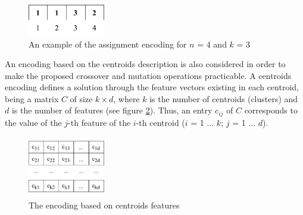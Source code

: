 \begin{figure}[h]
  \begin{center}
    \includegraphics[width=0.3\textwidth]{img/assignment-encoding}
    \caption{An example of the assignment encoding for $n$ = 4 and $k$ = 3}\label{fig:assignment-encoding}
  \end{center}
\end{figure}

An encoding based on the centroids description is also considered in order to make the proposed crossover and mutation operations practicable. A centroids encoding defines a solution through the feature vectors existing in each centroid, being a matrix $C$ of size $k \times d$, where $k$ is the number of centroids (clusters) and $d$ is the number of features (see figure \ref{fig:centroids-encoding}). Thus, an entry $c_{ij}$ of $C$ corresponds to the value of the $j$-th feature of the $i$-th centroid ($i$ = 1 ... $k$; $j$ = 1 ... $d$).


\begin{figure}[h]
  \begin{center}
    \includegraphics[width=0.3\textwidth]{img/centroids-encoding}
    \caption{The encoding based on centroids features}\label{fig:centroids-encoding}
  \end{center}
\end{figure}


